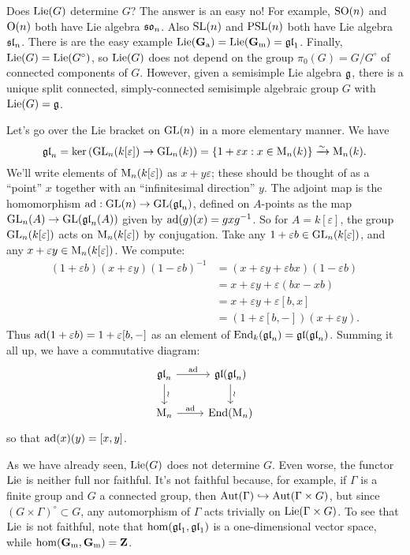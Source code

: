 Does $\operatorname{Lie}(G)$ determine $G$? The answer is an easy no! For example, 
$\operatorname{SO}(n)$ and $\operatorname{O}(n)$ both have Lie algebra $\mathfrak{so}_n$. Also 
$\operatorname{SL}(n)$ and $\operatorname{PSL}(n)$ both have Lie algebra $\mathfrak{sl}_n$. There is are the 
easy example $\operatorname{Lie}(\mathbf{G}_\mathrm{a})=\operatorname{Lie}(\mathbf{G}_\mathrm{m})=\mathfrak{gl}_1$. Finally, 
$\operatorname{Lie}(G)=\operatorname{Lie}(G^\circ)$, so $\operatorname{Lie}(G)$ does not depend on the group 
$\pi_0(G)=G/G^\circ$ of connected components of $G$. However, given a 
semisimple Lie algebra $\mathfrak{g}$, there is a unique split connected, 
simply-connected semisimple algebraic group $G$ with $\operatorname{Lie}(G)=\mathfrak{g}$. 

\begin{example}
Let's go over the Lie bracket on $\operatorname{GL}(n)$ in a more elementary manner. We have 
\[
  \mathfrak{gl}_n 
    = \ker\left(\operatorname{GL}_n(k[\varepsilon])\to\operatorname{GL}_n(k)\right) 
    = \{1+\varepsilon x:x\in \operatorname{M}_n(k)\} \xrightarrow\sim \operatorname{M}_n(k) .
\]
We'll write elements of $\operatorname{M}_n(k[\varepsilon])$ as $x+y\varepsilon$; 
these should be thought of as a ``point'' $x$ together with an ``infinitesimal 
direction'' $y$. The adjoint map is the homomorphism 
$\operatorname{ad}:\operatorname{GL}(n)\to \operatorname{GL}(\mathfrak{gl}_n)$, defined on $A$-points as the map 
$\operatorname{GL}_n(A)\to \operatorname{GL}(\mathfrak{gl}_n(A))$ given by $\operatorname{ad}(g)(x) = g x g^{-1}$. So for 
$A=k[\varepsilon]$, the group $\operatorname{GL}_n(k[\varepsilon])$ acts on 
$\operatorname{M}_n(k[\varepsilon])$ by conjugation. Take any 
$1+\varepsilon b\in \operatorname{GL}_n(k[\varepsilon])$, and any 
$x+\varepsilon y\in \operatorname{M}_n(k[\varepsilon])$. We compute: 
\begin{align*}
  (1+\varepsilon b)(x+\varepsilon y)(1-\varepsilon b)^{-1} 
    &= (x+\varepsilon y+\varepsilon b x)(1-\varepsilon b) \\
    &= x+\varepsilon y + \varepsilon(b x-x b) \\
    &= x+\varepsilon y + \varepsilon [b,x] \\
    &= (1+\varepsilon[b,-])(x+\varepsilon y) .
\end{align*}
Thus $\operatorname{ad}(1+\varepsilon b)=1+\varepsilon [b,-]$ as an element of 
$\operatorname{End}_k(\mathfrak{gl}_n) = \mathfrak{gl}(\mathfrak{gl}_n)$. Summing it all up, we have a commutative 
diagram: 
\[\begin{tikzcd}
  \gl_n \ar[r, "\adjoint"] \ar[d, "\wr"]
    & \gl(\gl_n) \ar[d, "\wr"] \\
  \matrices_n \ar[r, "\adjoint"] 
    & \End(\matrices_n)
\end{tikzcd}\]
so that $\operatorname{ad}(x)(y) = [x,y]$. 
\end{example}

As we have already seen, $\operatorname{Lie}(G)$ does not determine $G$. Even worse, the 
functor $\operatorname{Lie}$ is neither full nor faithful. It's not faithful because, for 
example, if $\Gamma$ is a finite group and $G$ a connected group, then 
$\operatorname{Aut}(\Gamma)\hookrightarrow \operatorname{Aut}(\Gamma\times G)$, but 
since $(G\times\Gamma)^\circ\subset G$, any automorphism of $\Gamma$ acts 
trivially on $\operatorname{Lie}(\Gamma\times G)$. To see that $\operatorname{Lie}$ is not faithful, 
note that $\hom(\mathfrak{gl}_1,\mathfrak{gl}_1)$ is a one-dimensional vector space, while 
$\hom(\mathbf{G}_\mathrm{m},\mathbf{G}_\mathrm{m})=\mathbf{Z}$. 

